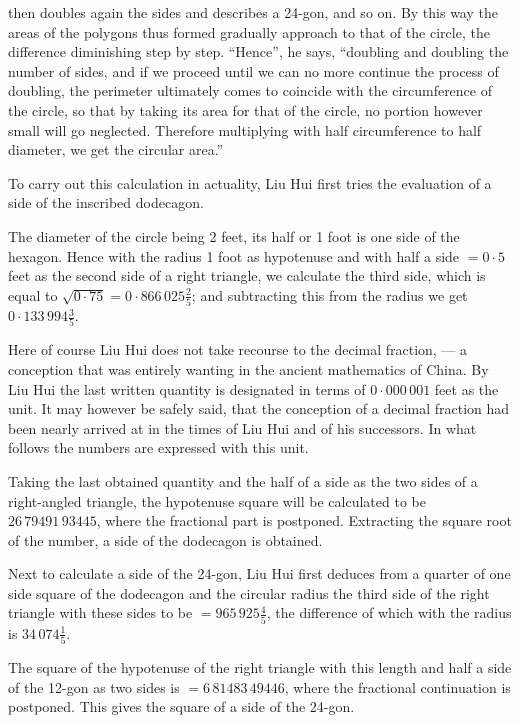 \documentclass[11pt]{article}
\newcommand{\scanpage}[2]{\clearpage\setcounter{footnote}{0}\noindent{\footnotesize\color{gray}PDF page #1 · #2}\par\medskip}
\begin{document}
\scanpage{0062}{Chapter 7, printed page 48}
then doubles again the sides and describes a 24-gon, and so on. By this way the areas of the polygons thus formed gradually approach to that of the circle, the difference diminishing step by step. ``Hence'', he says, ``doubling and doubling the number of sides, and if we proceed until we can no more continue the process of doubling, the perimeter ultimately comes to coincide with the circumference of the circle, so that by taking its area for that of the circle, no portion however small will go neglected. Therefore multiplying with half circumference to half diameter, we get the circular area.''

To carry out this calculation in actuality, Liu Hui first tries the evaluation of a side of the inscribed dodecagon.

The diameter of the circle being 2 feet, its half or 1 foot is one side of the hexagon. Hence with the radius 1 foot as hypotenuse and with half a side $=0\cdot5$ feet as the second side of a right triangle, we calculate the third side, which is equal to $\sqrt{0\cdot75}=0\cdot866\,025\frac{2}{5}$; and subtracting this from the radius we get $0\cdot133\,994\frac{3}{5}$.

Here of course Liu Hui does not take recourse to the decimal fraction, --- a conception that was entirely wanting in the ancient mathematics of China. By Liu Hui the last written quantity is designated in terms of $0\cdot000\,001$ feet as the unit. It may however be safely said, that the conception of a decimal fraction had been nearly arrived at in the times of Liu Hui and of his successors. In what follows the numbers are expressed with this unit.

Taking the last obtained quantity and the half of a side as the two sides of a right-angled triangle, the hypotenuse square will be calculated to be $26\,79491\,93445$, where the fractional part is postponed. Extracting the square root of the number, a side of the dodecagon is obtained.

Next to calculate a side of the 24-gon, Liu Hui first deduces from a quarter of one side square of the dodecagon and the circular radius the third side of the right triangle with these sides to be $=965\,925\frac{4}{5}$, the difference of which with the radius is $34\,074\frac{1}{5}$.

The square of the hypotenuse of the right triangle with this length and half a side of the 12-gon as two sides is $=6\,81483\,49446$, where the fractional continuation is postponed. This gives the square of a side of the 24-gon.
\end{document}
